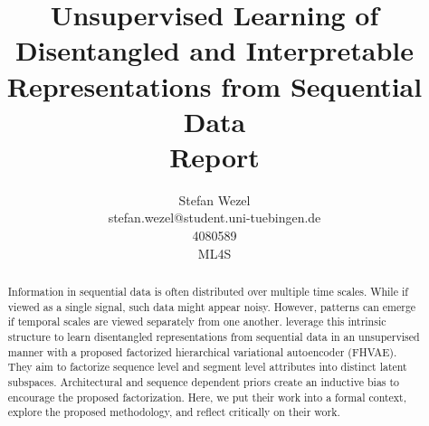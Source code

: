 \documentclass{article} %
\title{Unsupervised Learning of Disentangled and Interpretable Representations from Sequential Data\\ \vspace{0.5cm}\large{Report}}
\author{Stefan Wezel \\ stefan.wezel@student.uni-tuebingen.de \\4080589  \\ ML4S}
\begin{document}
\maketitle

\begin{abstract}

%



Information in sequential data is often distributed over multiple time scales.
While if viewed as a single signal, such data might appear noisy. However, patterns can emerge if temporal scales are viewed separately from one another.
\citet{hsu2017unsupervised} leverage this intrinsic structure to learn disentangled representations from sequential data in an unsupervised manner with a proposed factorized hierarchical variational autoencoder (FHVAE). They aim to factorize sequence level and segment level attributes into distinct latent subspaces. Architectural and sequence dependent priors create an inductive bias to encourage the proposed factorization. Here, we put their work into a formal context, explore the proposed methodology, and reflect critically on their work.
\end{abstract}
\end{document}
